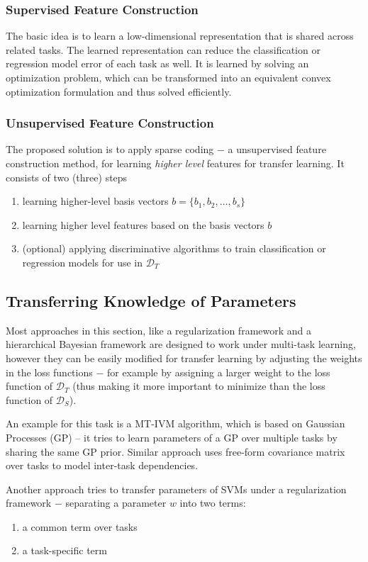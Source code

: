\documentclass[a4paper,twocolumn]{article}
\newcommand{\D}{\mathcal{D}}
\begin{document}
\subsubsection{Supervised Feature Construction}
The basic idea is to learn a low-dimensional representation that is shared across related tasks. The learned representation can reduce the classification or regression model error of each task as well. It is learned by solving an optimization problem, which can be transformed into an equivalent convex optimization formulation and thus solved efficiently.
\subsubsection{Unsupervised Feature Construction}
The proposed solution is to apply sparse coding $-$ a unsupervised feature construction method, for learning \textit{higher level} features for transfer learning.
It consists of two (three) steps
\begin{enumerate}
    \item learning higher-level basis vectors $b = \{b_1, b_2, \ldots, b_s\}$
    \item learning higher level features based on the basis vectors $b$
    \item (optional) applying discriminative algorithms to train classification or regression models for use in $\D_T$
\end{enumerate}
\subsection{Transferring Knowledge of Parameters}
Most approaches in this section, like a regularization framework and a hierarchical Bayesian framework are designed to work under multi-task learning, however they can be easily modified for transfer learning by adjusting the weights in the loss functions $-$ for example by assigning a larger weight to the loss function of $\D_T$ (thus making it more important to minimize than the loss function of $\D_S$).

An example for this task is a MT-IVM algorithm, which is based on Gaussian Processes (GP) – it tries to learn parameters of a GP over multiple tasks by sharing the same GP prior.
Similar approach uses free-form covariance matrix over tasks to model inter-task dependencies.

Another approach tries to transfer parameters of SVMs under a regularization framework $-$ separating a parameter $w$ into two terms:
\begin{enumerate}
    \item a common term over tasks
    \item a task-specific term
\end{enumerate}
\end{document}
